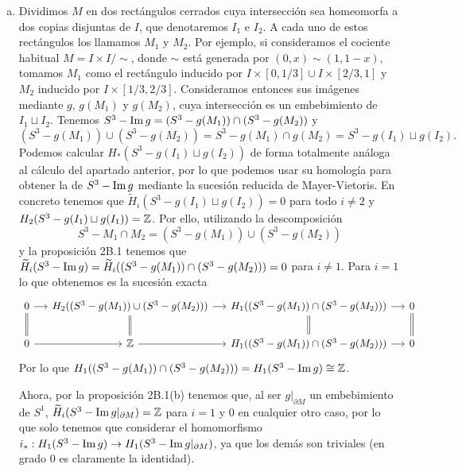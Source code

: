 \documentclass[twoside]{article}
\begin{document}
\begin{solucion}
\begin{enumerate}[(a)]


\item Dividimos $M$ en dos rectángulos cerrados cuya intersección sea homeomorfa a dos copias disjuntas de $I$, que denotaremos $I_1$ e $I_2$. A cada uno de estos rectángulos los llamamos $M_1$ y $M_2$. Por ejemplo, si consideramos el cociente habitual $M=I\times I/\sim$, donde $\sim$ está generada por $(0,x)\sim (1,1-x)$, tomamos $M_1$ como el rectángulo inducido por $I\times [0,1/3]\cup I\times [2/3,1]$ y $M_2$ inducido por $I\times [1/3,2/3]$. Consideramos entonces sus imágenes mediante $g$, $g(M_1)$ y $g(M_2)$, cuya intersección es un embebimiento de $I_1\sqcup I_2$. Tenemos $S^3-\operatorname{Im} g =(S^3-g(M_1))\cap (S^3-g(M_2))$ y $$(S^3-g(M_1))\cup (S^3-g(M_2))=S^3-g(M_1)\cap g(M_2)= S^3-g(I_1)\sqcup g(I_2).$$
 Podemos calcular $H_*(S^3-g(I_1)\sqcup g(I_2))$ de forma totalmente análoga al cálculo del apartado anterior, por lo que podemos usar su homología para obtener la de $S^3-\operatorname{Im} g$ mediante la sucesión reducida de Mayer-Vietoris. En concreto tenemos que $\widetilde{H}_i(S^3-g(I_1)\sqcup g(I_2))=0$ para todo $i\neq 2$ y $H_2(S^3-g(I_1)\sqcup g(I_1))=\mathbb{Z}$. Por ello, utilizando la descomposición $$S^3-M_1\cap M_2 =(S^3-g(M_1))\cup (S^3-g(M_2))$$ y la proposición 2B.1 tenemos que $\widetilde{H}_i(S^3-\operatorname{Im} g)=\widetilde{H}_i((S^3-g(M_1))\cap (S^3-g(M_2)))=0$ para $i\neq 1$. Para $i=1$ lo que obtenemos es la sucesión exacta
\[
\begin{tikzcd}[column sep=13]
0\arrow[r]\arrow[d, equals] & H_2((S^3-g(M_1))\cup (S^3-g(M_2)))\arrow[r]\arrow[d, equals] & H_1((S^3-g(M_1))\cap (S^3-g(M_2)))\arrow[r]\arrow[d,equals] & 0\arrow[d, equals]\\
0 \arrow[r] & \Z\arrow[r] & H_1((S^3-g(M_1))\cap (S^3-g(M_2)))\arrow[r] & 0
\end{tikzcd}
\]
Por lo que $H_1((S^3-g(M_1))\cap (S^3-g(M_2)))=H_1(S^3-\operatorname{Im} g)\cong \mathbb{Z}$. 

Ahora, por la proposición 2B.1(b) tenemos que, al ser $g|_{\partial M}$ un embebimiento de $S^1$, $\widetilde{H}_i(S^3-\operatorname{Im} g|_{\partial M})=\mathbb{Z}$ para $i=1$ y 0 en cualquier otro caso, por lo que solo tenemos que considerar el homomorfismo $i_*:H_1(S^3-\operatorname{Im} g)\to H_1(S^3-\operatorname{Im} g|_{\partial M})$, ya que los demás son triviales (en grado 0 es claramente la identidad). 


\end{enumerate}
\end{solucion}
\end{document}
